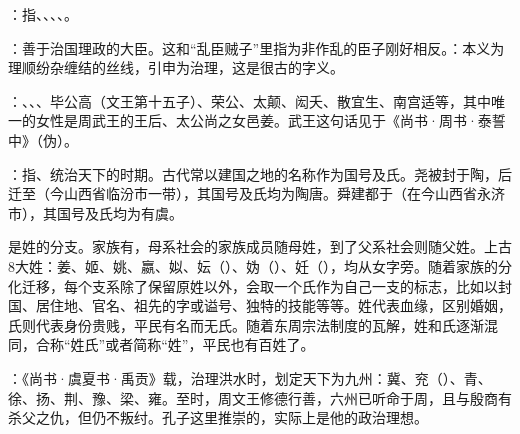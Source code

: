 {
\item {}：指、、、、。
\item {}：善于治国理政的大臣。这和“乱臣贼子”里指为非作乱的臣子刚好相反。：本义为理顺纷杂缠结的丝线，引申为治理，这是很古的字义。

：、、、毕公高（文王第十五子）、荣公、太颠、闳夭、散宜生、南宫适等，其中唯一的女性是周武王的王后、太公尚之女邑姜。武王这句话见于《尚书·周书·泰誓中》（伪）。

\item {}：指、统治天下的时期。古代常以建国之地的名称作为国号及氏。尧被封于陶，后迁至（今山西省临汾市一带），其国号及氏均为陶唐。舜建都于（在今山西省永济市），其国号及氏均为有虞。%

是姓的分支。家族有，母系社会的家族成员随母姓，到了父系社会则随父姓。上古8大姓：姜、姬、姚、嬴、姒、妘（）、妫（）、妊（），均从女字旁。随着家族的分化迁移，每个支系除了保留原姓以外，会取一个氏作为自己一支的标志，比如以封国、居住地、官名、祖先的字或谥号、独特的技能等等。姓代表血缘，区别婚姻，氏则代表身份贵贱，平民有名而无氏。随着东周宗法制度的瓦解，姓和氏逐渐混同，合称“姓氏”或者简称“姓”，平民也有百姓了。

\item {}：《尚书·虞夏书·禹贡》载，治理洪水时，划定天下为九州：冀、兖（）、青、徐、扬、荆、豫、梁、雍。至时，周文王修德行善，六州已听命于周，且与殷商有杀父之仇，但仍不叛纣。孔子这里推崇的，实际上是他的政治理想。

}
